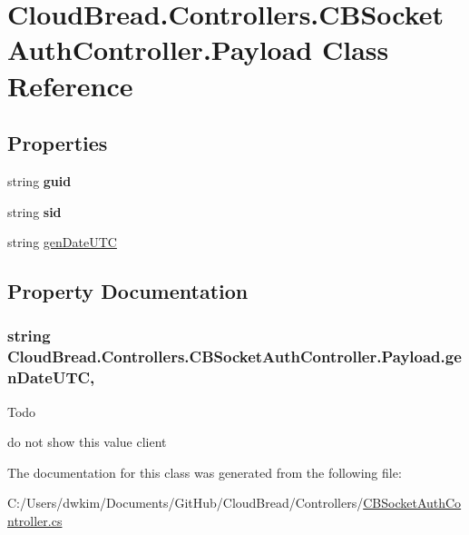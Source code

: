 \hypertarget{a00082}{}\section{Cloud\+Bread.\+Controllers.\+C\+B\+Socket\+Auth\+Controller.\+Payload Class Reference}
\label{a00082}
\subsection*{Properties}
\begin{DoxyCompactItemize}
\item 
string {\bfseries guid}\hypertarget{a00082_aa2de66cdffd308627d2c00ef0514d560}{}\label{a00082_aa2de66cdffd308627d2c00ef0514d560}

\item 
string {\bfseries sid}\hypertarget{a00082_af7bc9e4d78c4087c82a2aab7c547868d}{}\label{a00082_af7bc9e4d78c4087c82a2aab7c547868d}

\item 
string \hyperlink{a00082_a8578f804b87fd27135c1d3f4712aa7e0}{gen\+Date\+U\+TC}
\end{DoxyCompactItemize}


\subsection{Property Documentation}
\subsubsection[{\texorpdfstring{gen\+Date\+U\+TC}{genDateUTC}}]{\setlength{\rightskip}{0pt plus 5cm}string Cloud\+Bread.\+Controllers.\+C\+B\+Socket\+Auth\+Controller.\+Payload.\+gen\+Date\+U\+TC\hspace{0.3cm}{\ttfamily [get]}, {\ttfamily [set]}}\hypertarget{a00082_a8578f804b87fd27135c1d3f4712aa7e0}{}\label{a00082_a8578f804b87fd27135c1d3f4712aa7e0}
\begin{DoxyRefDesc}{Todo}
\item[\hyperlink{a00001__todo000017}{Todo}]do not show this value client \end{DoxyRefDesc}


The documentation for this class was generated from the following file\+:\begin{DoxyCompactItemize}
\item 
C\+:/\+Users/dwkim/\+Documents/\+Git\+Hub/\+Cloud\+Bread/\+Controllers/\hyperlink{a00153}{C\+B\+Socket\+Auth\+Controller.\+cs}\end{DoxyCompactItemize}
